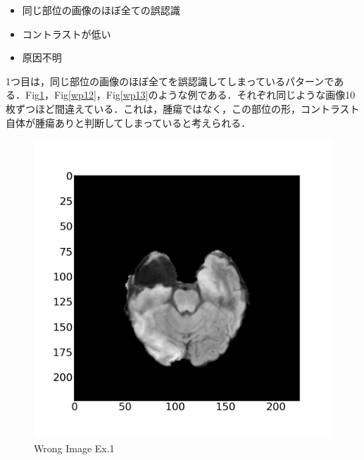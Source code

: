 \documentclass[11pt,a4j]{jarticle}
\begin{document}
\begin{itemize}
	\item 同じ部位の画像のほぼ全ての誤認識
	\item コントラストが低い
	\item 原因不明
\end{itemize}

1つ目は，同じ部位の画像のほぼ全てを誤認識してしまっているパターンである．Fig\ref{wp11}，Fig\ref{wp12}，Fig\ref{wp13}のような例である．それぞれ同じような画像10枚ずつほど間違えている．これは，腫瘍ではなく，この部位の形，コントラスト自体が腫瘍ありと判断してしまっていると考えられる．

\begin{figure}[ht]
	\begin{minipage}{0.32\hsize}
		\centering
		\includegraphics[width=\linewidth]{../2_MedicalImageClassification/Dataset/1253.jpg}
		\vspace{-1cm}
		\renewcommand{\figurename}{Fig}
		\caption{Wrong Image Ex.1}
		\label{wp11}
	\end{minipage}
	\begin{minipage}{0.32\hsize}
		\centering

\end{minipage}
\end{figure}
\end{document}
